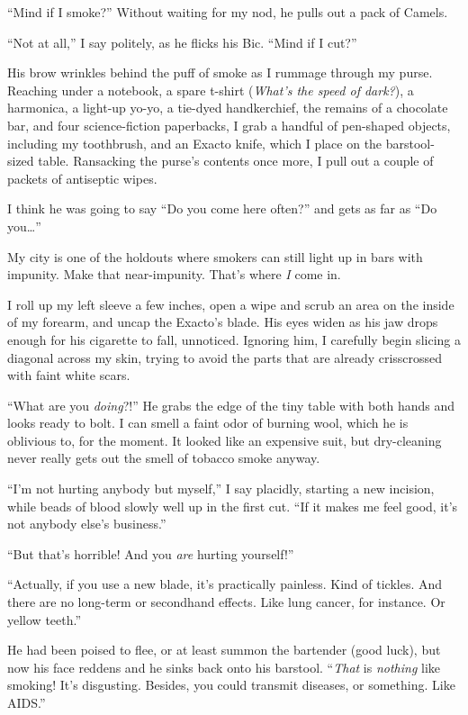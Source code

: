 
``Mind if I smoke?'' Without waiting for my nod, he pulls out a pack of
Camels.

``Not at all,'' I say politely, as he flicks his Bic. ``Mind if I cut?''

His brow wrinkles behind the puff of smoke as I rummage through my
purse. Reaching under a notebook, a spare t-shirt (\emph{What's the
speed of dark?}), a harmonica, a light-up yo-yo, a tie-dyed
handkerchief, the remains of a chocolate bar, and four science-fiction
paperbacks, I grab a handful of pen-shaped objects, including my
toothbrush, and an Exacto knife, which I place on the barstool-sized
table. Ransacking the purse's contents once more, I pull out a couple of
packets of antiseptic wipes.

I think he was going to say ``Do you come here often?'' and gets as far
as ``Do you\ldots''

My city is one of the holdouts where smokers can still light up in bars
with impunity. Make that near-impunity. That's where \emph{I} come in.

I roll up my left sleeve a few inches, open a wipe and scrub an area on
the inside of my forearm, and uncap the Exacto's blade. His eyes widen
as his jaw drops enough for his cigarette to fall, unnoticed. Ignoring
him, I carefully begin slicing a diagonal across my skin, trying to
avoid the parts that are already crisscrossed with faint white scars.

``What are you \emph{doing}?!'' He grabs the edge of the tiny table with
both hands and looks ready to bolt. I can smell a faint odor of burning
wool, which he is oblivious to, for the moment. It looked like an
expensive suit, but dry-cleaning never really gets out the smell of
tobacco smoke anyway.

``I'm not hurting anybody but myself,'' I say placidly, starting a new
incision, while beads of blood slowly well up in the first cut. ``If it
makes me feel good, it's not anybody else's business.''

``But that's horrible! And you \emph{are} hurting yourself!''

``Actually, if you use a new blade, it's practically painless. Kind of
tickles. And there are no long-term or secondhand effects. Like lung
cancer, for instance. Or yellow teeth.''

He had been poised to flee, or at least summon the bartender (good
luck), but now his face reddens and he sinks back onto his barstool.
``\emph{That} is \emph{nothing} like smoking! It's disgusting. Besides,
you could transmit diseases, or something. Like AIDS.''

